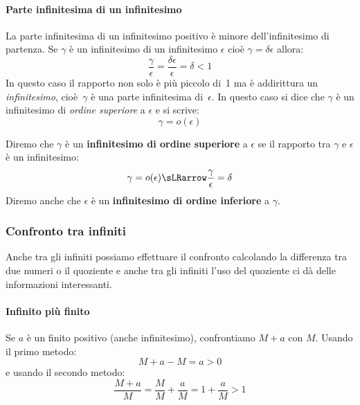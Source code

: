 \paragraph{Parte infinitesima di un infinitesimo}
La parte infinitesima di un infinitesimo positivo è minore 
dell'infinitesimo di partenza. Se \(\gamma\) è un infinitesimo di 
un infinitesimo \(\epsilon\) cioè \(\gamma= \delta \epsilon\) allora:
\[\frac{\gamma}{\epsilon} = \frac{\delta \epsilon}{\epsilon}=\delta < 1\]
In questo caso il rapporto non solo è più piccolo di~1 ma è addirittura un 
\emph{infinitesimo}, 
cioè~\(\gamma\) è una parte infinitesima di~\(\epsilon\). 
In questo caso 
si dice che \(\gamma\) è un infinitesimo di \emph{ordine superiore} a 
\(\epsilon\) e si scrive:
\[\gamma=o(\epsilon)\]
\begin{definizione}
 Diremo che \(\gamma\) è un \textbf{infinitesimo di ordine superiore} a 
\(\epsilon\) se il rapporto tra \(\gamma\) e \(\epsilon\) è un infinitesimo:
\[\gamma=o(\epsilon) \sLRarrow \frac{\gamma}{\epsilon}=\delta\]
Diremo anche che 
\(\epsilon\) è un \textbf{infinitesimo di ordine inferiore} a \(\gamma\).
\end{definizione}

\subsubsection{Confronto tra infiniti}
\label{subsubsec:insnum_confrontoreali}

Anche tra gli infiniti possiamo effettuare il confronto calcolando la 
differenza tra due numeri o il quoziente e anche tra gli infiniti l'uso del 
quoziente ci dà delle informazioni interessanti.


\paragraph{Infinito più finito}
Se \(a\) è un finito positivo (anche infinitesimo), confrontiamo \(M+a\) 
con \(M\). 
Usando il primo metodo:
\[M+a-M = a > 0\]
e usando il secondo metodo: 
\[\frac{M+a}{M} =
  \frac{M}{M} + \frac{a}{M} = 
  1 + \frac{a}{M} > 1\]
